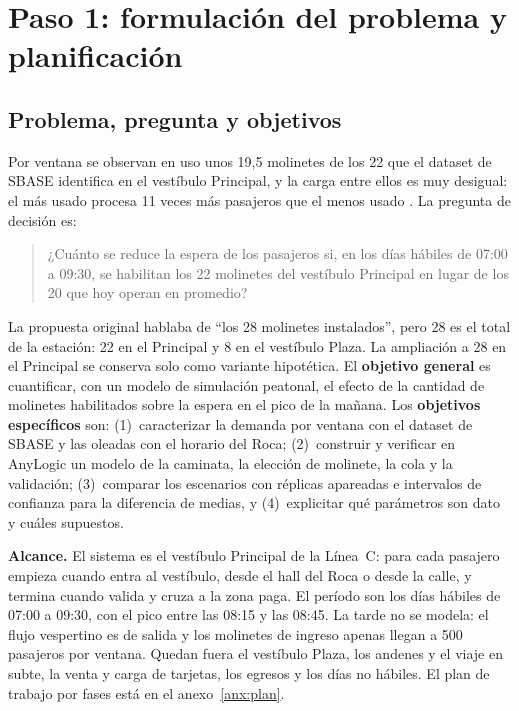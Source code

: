 \section{Paso 1: formulación del problema y planificación}
\label{sec:paso1-formulacion}

\subsection{Problema, pregunta y objetivos}

Por ventana se observan en uso unos 19,5 molinetes de los 22 que el dataset de SBASE identifica en el
vestíbulo Principal, y la carga entre ellos es muy desigual: el más usado procesa 11 veces más pasajeros que
el menos usado \parencite{sbase2026molinetes}. La pregunta de decisión es:

\begin{quote}
¿Cuánto se reduce la espera de los pasajeros si, en los días hábiles de 07:00 a 09:30, se habilitan los
22 molinetes del vestíbulo Principal en lugar de los 20 que hoy operan en promedio?
\end{quote}

La propuesta original hablaba de \enquote{los 28 molinetes instalados}, pero 28 es el total de la estación:
22 en el Principal y 8 en el vestíbulo Plaza. La ampliación a 28 en el Principal se conserva solo como
variante hipotética. El \textbf{objetivo general} es cuantificar, con un modelo de simulación peatonal, el
efecto de la cantidad de molinetes habilitados sobre la espera en el pico de la mañana. Los
\textbf{objetivos específicos} son: (1)~caracterizar la demanda por ventana con el dataset de SBASE y las
oleadas con el horario del Roca; (2)~construir y verificar en AnyLogic un modelo de la caminata, la elección
de molinete, la cola y la validación; (3)~comparar los escenarios con réplicas apareadas e intervalos de
confianza para la diferencia de medias, y (4)~explicitar qué parámetros son dato y cuáles supuestos.

\textbf{Alcance.} El sistema es el vestíbulo Principal de la Línea~C: para cada pasajero empieza cuando entra
al vestíbulo, desde el hall del Roca o desde la calle, y termina cuando valida y cruza a la zona paga. El
período son los días hábiles de 07:00 a 09:30, con el pico entre las 08:15 y las 08:45. La tarde no se modela:
el flujo vespertino es de salida y los molinetes de ingreso apenas llegan a 500 pasajeros por ventana. Quedan
fuera el vestíbulo Plaza, los andenes y el viaje en subte, la venta y carga de tarjetas, los egresos y los
días no hábiles. El plan de trabajo por fases está en el anexo~\ref{anx:plan}.

